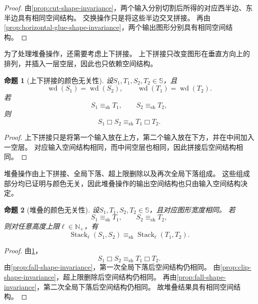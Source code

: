 \documentclass[UTF8,fontset=none]{ctexart}
\theoremstyle{cnthm}
\newtheorem{proposition}{命题}[section]
\begin{document}
			\begin{proof}
				由\cref{prop:cut-shape-invariance}，两个输入分别切割后所得的对应西半边、东半边具有相同空间结构。
				交换操作只是将这些半边交叉拼接。
				再由\cref{prop:horizontal-glue-shape-invariance}，两个输出图形分别具有相同空间结构。
			\end{proof}
			
			为了处理堆叠操作，还需要考虑上下拼接。
			上下拼接只改变图形在垂直方向上的排列，并插入一层空层，因此也只依赖空间结构。
			
			\begin{proposition}[上下拼接的颜色无关性]\label{prop:vertical-glue-shape-invariance}
				设$S_1,T_1,S_2,T_2\in\mathbb{S}$，且
				$$
				\operatorname{wd}(S_1)=\operatorname{wd}(S_2),
				\qquad
				\operatorname{wd}(T_1)=\operatorname{wd}(T_2).
				$$
				若
				$$
				S_1\equiv_{\mathrm{sh}}T_1,
				\qquad
				S_2\equiv_{\mathrm{sh}}T_2,
				$$
				则
				$$
				S_1\mathbin{\Box}S_2
				\equiv_{\mathrm{sh}}
				T_1\mathbin{\Box}T_2.
				$$
			\end{proposition}
			
			\begin{proof}
				上下拼接只是将第一个输入放在上方，第二个输入放在下方，并在中间加入一空层。
				对应输入空间结构相同，而中间空层也相同，因此拼接后空间结构相同。
			\end{proof}
			
			堆叠操作由上下拼接、全局下落、超上限删除以及再次全局下落组成。
			这些组成部分均已证明与颜色无关，因此堆叠操作的输出空间结构也只由输入空间结构决定。
			
			\begin{proposition}[堆叠的颜色无关性]\label{prop:stack-shape-invariance}
				设$S_1,T_1,S_2,T_2\in\mathbb{S}$，且对应图形宽度相同。
				若
				$$
				S_1\equiv_{\mathrm{sh}}T_1,
				\qquad
				S_2\equiv_{\mathrm{sh}}T_2,
				$$
				则对任意高度上限$\ell\in\mathbb{N}_{+}$，有
				$$
				\operatorname{Stack}_\ell(S_1,S_2)
				\equiv_{\mathrm{sh}}
				\operatorname{Stack}_\ell(T_1,T_2).
				$$
			\end{proposition}
			
			\begin{proof}
				由\cref{prop:vertical-glue-shape-invariance}，
				$$
				S_1\mathbin{\Box}S_2
				\equiv_{\mathrm{sh}}
				T_1\mathbin{\Box}T_2.
				$$
				由\cref{prop:fall-shape-invariance}，第一次全局下落后空间结构仍相同。
				由\cref{prop:clip-shape-invariance}，超上限删除后空间结构仍相同。
				再由\cref{prop:fall-shape-invariance}，第二次全局下落后空间结构仍相同。
				故堆叠结果具有相同空间结构。
			\end{proof}
			
\end{document}

